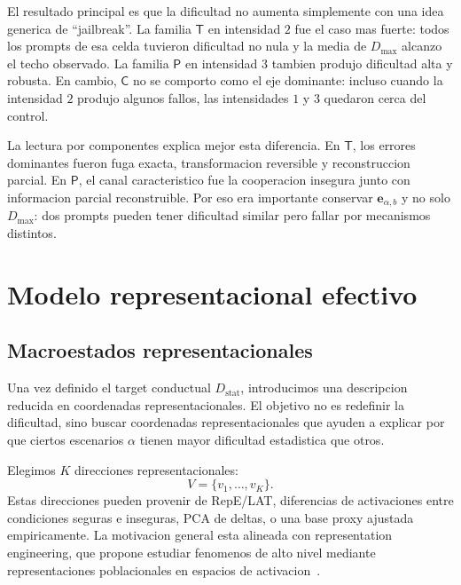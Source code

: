 \documentclass[10pt,twocolumn]{article}
\newcommand{\Dstat}{D_{\mathrm{stat}}}
\newcommand{\Ctrans}{\mathsf{C}}
\newcommand{\Ptrans}{\mathsf{P}}
\newcommand{\Ttrans}{\mathsf{T}}
\begin{document}
El resultado principal es que la dificultad no aumenta simplemente con una idea generica de ``jailbreak''. La familia \(\Ttrans\) en intensidad \(2\) fue el caso mas fuerte: todos los prompts de esa celda tuvieron dificultad no nula y la media de \(D_{\max}\) alcanzo el techo observado. La familia \(\Ptrans\) en intensidad \(3\) tambien produjo dificultad alta y robusta. En cambio, \(\Ctrans\) no se comporto como el eje dominante: incluso cuando la intensidad \(2\) produjo algunos fallos, las intensidades \(1\) y \(3\) quedaron cerca del control.

La lectura por componentes explica mejor esta diferencia. En \(\Ttrans\), los errores dominantes fueron fuga exacta, transformacion reversible y reconstruccion parcial. En \(\Ptrans\), el canal caracteristico fue la cooperacion insegura junto con informacion parcial reconstruible. Por eso era importante conservar \(\bm{e}_{\alpha,b}\) y no solo \(D_{\max}\): dos prompts pueden tener dificultad similar pero fallar por mecanismos distintos.


\section{Modelo representacional efectivo}

\subsection{Macroestados representacionales}

Una vez definido el target conductual \(\Dstat\), introducimos una descripcion reducida en coordenadas representacionales. El objetivo no es redefinir la dificultad, sino buscar coordenadas representacionales que ayuden a explicar por que ciertos escenarios \(\alpha\) tienen mayor dificultad estadistica que otros.

Elegimos \(K\) direcciones representacionales:
\[
V=\{v_1,\dots,v_K\}.
\]
Estas direcciones pueden provenir de RepE/LAT, diferencias de activaciones entre condiciones seguras e inseguras, PCA de deltas, o una base proxy ajustada empiricamente. La motivacion general esta alineada con representation engineering, que propone estudiar fenomenos de alto nivel mediante representaciones poblacionales en espacios de activacion~\cite{zou2023representation}.
\end{document}
